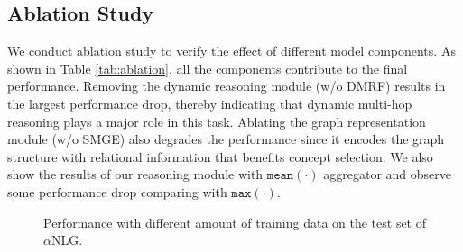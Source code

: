 \documentclass[11pt,a4paper]{article}
\begin{document}




\subsection{Ablation Study}



We conduct ablation study to verify the effect of different model components. As shown in Table \ref{tab:ablation}, all the components contribute to the final performance. Removing the dynamic reasoning module (w/o DMRF) results in the largest performance drop, thereby indicating that dynamic multi-hop reasoning plays a major role in this task. Ablating the graph representation module (w/o SMGE) also degrades the performance since it encodes the graph structure with relational information that benefits concept selection. We also show the results of our reasoning module with $\texttt{mean}(\cdot)$ aggregator and observe some performance drop comparing with $\texttt{max}(\cdot)$.




\begin{figure}[t]
\centering
{}
\caption{Performance with different amount of training data on the test set of $\alpha$NLG.}
\label{fig:amount}
\end{figure}
\end{document}
